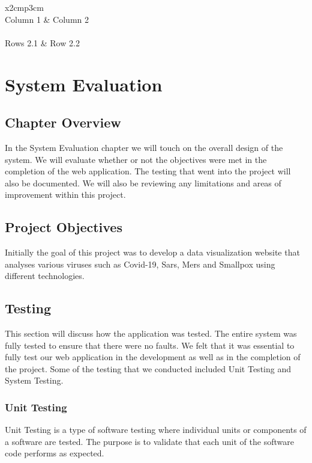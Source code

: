 \begin{table}[ht]
  \centering
  \begin{tabular}{x{2cm}p{3cm}}
    \toprule \\
    Column 1 & Column 2 \\
    \midrule \\
    Rows 2.1 & Row 2.2 \\
    \bottomrule
  \end{tabular}
  \caption{A table.}
  \label{table:mytable}
\end{table}

\chapter{System Evaluation}


\section{Chapter Overview}
In the System Evaluation chapter we will touch on the overall design of the system.
We will evaluate whether or not the objectives were met in the completion of the web application.
The testing that went into the project will also be documented.
We will also be reviewing any limitations and areas of improvement within this project.

\section{Project Objectives}
Initially the goal of this project was to develop a data visualization website that analyses various viruses such as Covid-19, Sars, Mers and Smallpox using different technologies.

\section{Testing}
This section will discuss how the application was tested.
The entire system was fully tested to ensure that there were no faults.
We felt that it was essential to fully test our web application in the development as well as in the completion of the project.
Some of the testing that we conducted included Unit Testing and System Testing.



\subsection{Unit Testing}
Unit Testing is a type of software testing where individual units or components of a software are tested. 
The purpose is to validate that each unit of the software code performs as expected.


